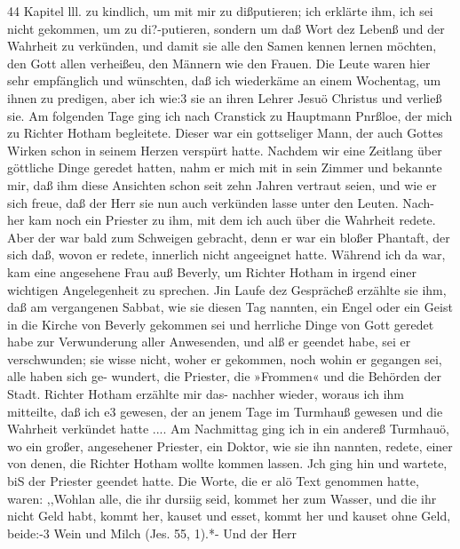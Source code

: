 44 Kapitel lll.
zu kindlich, um mit mir zu dißputieren; ich erklärte ihm, ich sei
nicht gekommen, um zu di?-putieren, sondern um daß Wort dez
Lebenß und der Wahrheit zu verkünden, und damit sie alle den
Samen kennen lernen möchten, den Gott allen verheißeu, den
Männern wie den Frauen. Die Leute waren hier sehr empfänglich
und wünschten, daß ich wiederkäme an einem Wochentag, um
ihnen zu predigen, aber ich wie:3 sie an ihren Lehrer Jesuö
Christus und verließ sie. Am folgenden Tage ging ich nach
Cranstick zu Hauptmann Pnrßloe, der mich zu Richter Hotham
begleitete. Dieser war ein gottseliger Mann, der auch Gottes
Wirken schon in seinem Herzen verspürt hatte. Nachdem wir eine
Zeitlang über göttliche Dinge geredet hatten, nahm er mich mit
in sein Zimmer und bekannte mir, daß ihm diese Ansichten
schon seit zehn Jahren vertraut seien, und wie er sich freue, daß
der Herr sie nun auch verkünden lasse unter den Leuten. Nach-
her kam noch ein Priester zu ihm, mit dem ich auch über die
Wahrheit redete. Aber der war bald zum Schweigen gebracht,
denn er war ein bloßer Phantaft, der sich daß, wovon er redete,
innerlich nicht angeeignet hatte.
Während ich da war, kam eine angesehene Frau auß Beverly,
um Richter Hotham in irgend einer wichtigen Angelegenheit zu
sprechen. Jin Laufe dez Gesprächeß erzählte sie ihm, daß am
vergangenen Sabbat, wie sie diesen Tag nannten, ein Engel oder
ein Geist in die Kirche von Beverly gekommen sei und herrliche
Dinge von Gott geredet habe zur Verwunderung aller Anwesenden,
und alß er geendet habe, sei er verschwunden; sie wisse nicht, woher
er gekommen, noch wohin er gegangen sei, alle haben sich ge-
wundert, die Priester, die »Frommen« und die Behörden der Stadt.
Richter Hotham erzählte mir das- nachher wieder, woraus ich ihm
mitteilte, daß ich e3 gewesen, der an jenem Tage im Turmhauß
gewesen und die Wahrheit verkündet hatte ....
Am Nachmittag ging ich in ein andereß Turmhauö, wo ein
großer, angesehener Priester, ein Doktor, wie sie ihn nannten,
redete, einer von denen, die Richter Hotham wollte kommen lassen.
Jch ging hin und wartete, biS der Priester geendet hatte. Die
Worte, die er alö Text genommen hatte, waren: ,,Wohlan alle,
die ihr dursiig seid, kommet her zum Wasser, und die ihr nicht
Geld habt, kommt her, kauset und esset, kommt her und kauset
ohne Geld, beide:-3 Wein und Milch (Jes. 55, 1).*- Und der Herr


